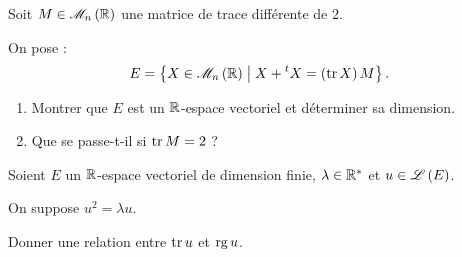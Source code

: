 \begin{corr}
\end{corr}

\begin{exo}[Exercice 9]
Soit \(M\in\M{n}[\R]\) une matrice de trace différente de \(2\).

On pose : \[E=\accol{X\in\M{n}[\R]\tq X+\trans{X}=\paren{\tr X}M}.\]

\begin{enumerate}
\item Montrer que \(E\) est un \(\mathbb{R}\)-espace vectoriel et déterminer sa dimension. \\

\item Que se passe-t-il si \(\operatorname{tr} M=2\) ?
\end{enumerate}
\end{exo}

\begin{corr}
\end{corr}

\begin{exo}[Exercice 10]
Soient \(E\) un \(\mathbb{R}\)-espace vectoriel de dimension finie, \(\lambda\in\mathbb{R}^*\) et \(u\in\mathscr{L}\left(E\right)\).

On suppose \(u^2=\lambda u\).

Donner une relation entre \(\operatorname{tr} u\) et \(\operatorname{rg} u\).
\end{exo}

\begin{corr}
\end{corr}